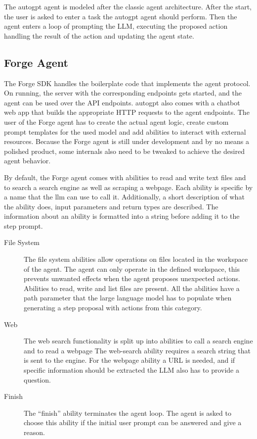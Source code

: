 \documentclass[../main.tex]{subfiles}
\begin{document}
The \gls{autogpt} agent is modeled after the classic agent architecture.
After the start,
the user is asked to enter a task the \gls{autogpt} agent should perform.
Then the agent enters a loop of prompting the LLM,
executing the proposed action
handling the result of the action and updating the agent state.

\subsection{Forge Agent}
\label{subsec:forge_agent}

The Forge SDK handles the boilerplate code that implements the agent protocol.
On running, the server with the corresponding endpoints gets started,
and the agent can be used over the API endpoints.
\Gls{autogpt} also comes with a chatbot web app
that builds the appropriate HTTP requests to the agent endpoints.
The user of the Forge agent has to create the actual agent logic,
create custom prompt templates for the used model and add abilities to interact with external resources.
Because the Forge agent is still under development and by no means a polished product,
some internals also need to be tweaked to achieve the desired agent behavior.

By default,
the Forge agent comes with abilities to read and write text files
and to search a search engine as well as scraping a webpage.
Each ability is specific by a name that the \gls{llm} can use to call it.
Additionally, a short description of what the ability does,
input parameters and return types are described.
The information about an ability is formatted into a string before adding it to the step prompt.

\begin{description}
      \item[File System] The file system abilities allow operations on files located in the workspace of the agent.
            The agent can only operate in the defined workspace, this prevents unwanted effects when the agent proposes unexpected actions.
            Abilities to read, write and list files are present.
            All the abilities have a path parameter that the large language model has to populate when generating a step proposal with actions from this category.
      \item[Web] The web search functionality is split up into abilities to call a search engine and to read a webpage
            The web-search ability requires a search string that is sent to the engine.
            For the webpage ability a URL is needed, and if specific information should be extracted the LLM also has to provide a question.
      \item[Finish] The “finish” ability terminates the agent loop.
            The agent is asked to choose this ability if the initial user prompt can be answered and give a reason.
\end{description}
\end{document}
